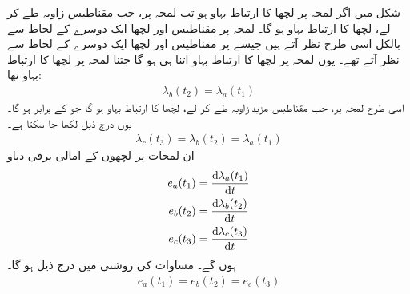  شکل   میں اگر لمحہ  پر  لچھا  کا  ارتباط بہاو  ہو تب لمحہ  پر، جب مقناطیس  زاویہ طے کر لے،   لچھا  کا ارتباط بہاو  ہو گا۔  لمحہ  پر مقناطیس اور لچھا  ایک دوسرے کے لحاظ سے بالکل اسی طرح نظر آتے  ہیں جیسے  پر مقناطیس اور لچھا  ایک دوسرے کے لحاظ سے نظر آتے تھے۔ یوں لمحہ  پر لچھا  کا ارتباط بہاو  اتنا ہی ہو گا جتنا لمحہ  پر   لچھا کا ارتباط بہاو تھا:
\begin{align}
\lambda_b(t_2)=\lambda_a(t_1)
\end{align}
اسی طرح  لمحہ  پر، جب مقناطیس مزید   زاویہ طے کر لے، لچھا  کا ارتباط بہاو   ہو گا جو  کے برابر ہو گا۔یوں درج ذیل لکھا جا سکتا ہے۔
\begin{align}\label{مساوات_گھومتے_مشین_مختلف_اوقات_پر_تین_لچھے_یکساں}
\lambda_c(t_3)=\lambda_b(t_2)=\lambda_a(t_1)
\end{align}
ان لمحات پر  لچھوں کے امالی برقی دباو
\begin{align}
e_a(t_1)&=\frac{\dif \lambda_a(t_1)}{\dif t}\\
e_b(t_2)&=\frac{\dif \lambda_b(t_2)}{\dif t}\\
e_c(t_3)&=\frac{\dif \lambda_c(t_3)}{\dif t}
\end{align}
ہوں گے۔ مساوات     کی روشنی میں درج ذیل ہو گا۔
\begin{align}\label{مساوات_گھومتے_مشین_تین_لمحات_دباو_یکساں}
e_a(t_1)=e_b(t_2)=e_c(t_3)
\end{align} 

